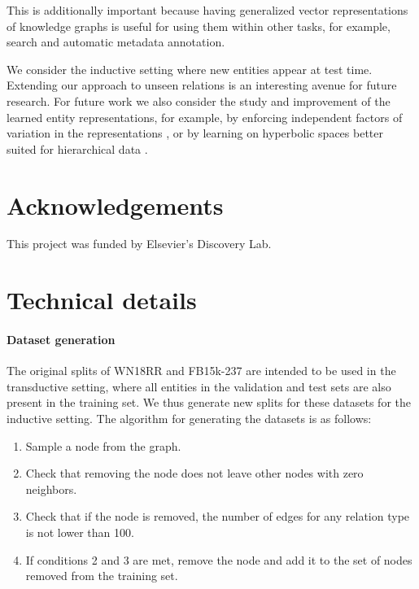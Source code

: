 \documentclass[sigconf]{acmart}
\begin{document}
This is additionally important because having generalized vector representations of knowledge graphs is useful for using them within other tasks, for example, search and automatic metadata annotation. 

We consider the inductive setting where new entities appear at test time. Extending our approach to unseen relations is an interesting avenue for future research. For future work we also consider the study and improvement of the learned entity representations, for example, by enforcing independent factors of variation in the representations \citep{locatello2019disentangle}, or by learning on hyperbolic spaces better suited for hierarchical data \citep{nickel2017poincare}.

\section{Acknowledgements}

This project was funded by Elsevier’s Discovery Lab.




\appendix

\section{Technical details}
\label{app:technical}

\paragraph{Dataset generation} The original splits of WN18RR and FB15k-237 are intended to be used in the transductive setting, where all entities in the validation and test sets are also present in the training set. We thus generate new splits for these datasets for the inductive setting. The algorithm for generating the datasets is as follows:
\begin{enumerate}
    \item Sample a node from the graph.
    \item Check that removing the node does not leave other nodes with zero neighbors.
    \item Check that if the node is removed, the number of edges for any relation type is not lower than 100.
    \item If conditions 2 and 3 are met, remove the node and add it to the set of nodes removed from the training set.
\end{enumerate}
\end{document}
